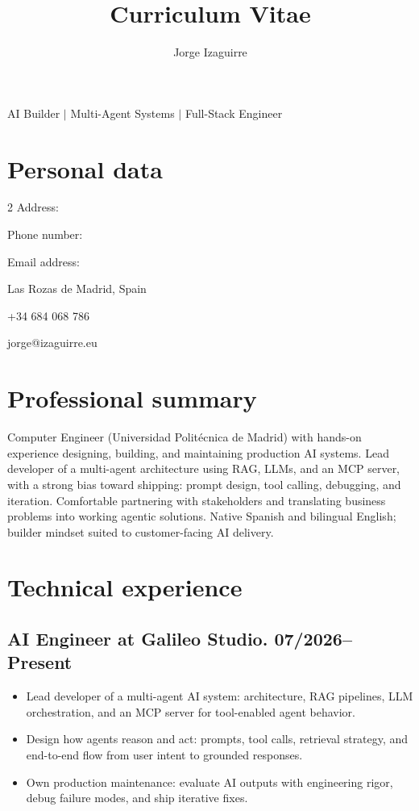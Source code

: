\documentclass{article}
\title{Curriculum Vitae}
\author{Jorge Izaguirre}
\date{}
\begin{document}

\maketitle

\begin{center}
AI Builder $|$ Multi-Agent Systems $|$ Full-Stack Engineer
\end{center}

\section*{Personal data}

\begin{multicols}{2}
\noindent Address:

\noindent Phone number:

\noindent Email address:

\columnbreak

\noindent Las Rozas de Madrid, Spain

\noindent +34 684 068 786

\noindent jorge@izaguirre.eu
\end{multicols}

\section*{Professional summary}

Computer Engineer (Universidad Polit\'ecnica de Madrid) with hands-on experience designing, building, and maintaining production AI systems. Lead developer of a multi-agent architecture using RAG, LLMs, and an MCP server, with a strong bias toward shipping: prompt design, tool calling, debugging, and iteration. Comfortable partnering with stakeholders and translating business problems into working agentic solutions. Native Spanish and bilingual English; builder mindset suited to customer-facing AI delivery.

\section*{Technical experience}

\subsection*{\hspace{0.25cm} AI Engineer at Galileo Studio. 07/2026--Present}
\begin{itemize}
    \item Lead developer of a multi-agent AI system: architecture, RAG pipelines, LLM orchestration, and an MCP server for tool-enabled agent behavior.

    \item Design how agents reason and act: prompts, tool calls, retrieval strategy, and end-to-end flow from user intent to grounded responses.

    \item Own production maintenance: evaluate AI outputs with engineering rigor, debug failure modes, and ship iterative fixes.
\end{itemize}
\end{document}
